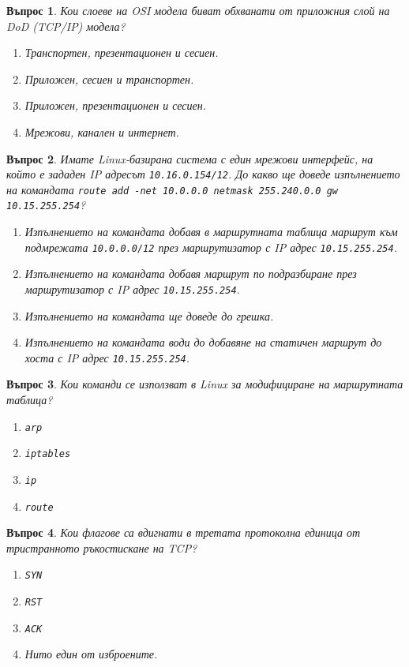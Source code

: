 \documentclass[11pt]{scrartcl}
\newtheorem{q}{Въпрос}
\newenvironment{defractors}{
\begin{enumerate}
  \setlength{\itemsep}{1pt}
  \setlength{\parskip}{0pt}
  \setlength{\parsep}{0pt}
}{\end{enumerate}}
\begin{document}
\begin{q}
  Кои слоеве на OSI модела биват обхванати от приложния слой на DoD (TCP/IP) модела?

  \begin{defractors}
    \item Транспортен, презентационен и сесиен.
    \item Приложен, сесиен и транспортен.
    \item Приложен, презентационен и сесиен.
    \item Мрежови, канален и интернет.
  \end{defractors}
\end{q}

\begin{q}
  Имате Linux-базирана система с един мрежови интерфейс, на който е зададен IP
  адресът \texttt{10.16.0.154/12}. До какво ще доведе изпълнението на командата
  \texttt{route add -net 10.0.0.0 netmask 255.240.0.0 gw 10.15.255.254}?

  \begin{defractors}
  \item Изпълнението на командата добавя в маршрутната таблица маршрут към
    подмрежата \texttt{10.0.0.0/12} през маршрутизатор с IP адрес
    \texttt{10.15.255.254}.
    \item Изпълнението на командата добавя маршрут по подразбиране през
      маршрутизатор с IP адрес \texttt{10.15.255.254}.
    \item Изпълнението на командата ще доведе до грешка.
    \item Изпълнението на командата води до добавяне на статичен маршрут до
      хоста с IP адрес \texttt{10.15.255.254}.
 \end{defractors}
\end{q}

\begin{q}
  Кои команди се използват в Linux за модифициране на маршрутната таблица?

  \begin{defractors}
    \item \texttt{arp}
    \item \texttt{iptables}
    \item \texttt{ip}
    \item \texttt{route}
  \end{defractors}
\end{q}

\begin{q}
  Кои флагове са вдигнати в третата протоколна единица от тристранното
  ръкостискане на TCP?

  \begin{defractors}
    \item \texttt{SYN}
    \item \texttt{RST}
    \item \texttt{ACK}
    \item Нито един от изброените.
  \end{defractors}
\end{q}
\end{document}
